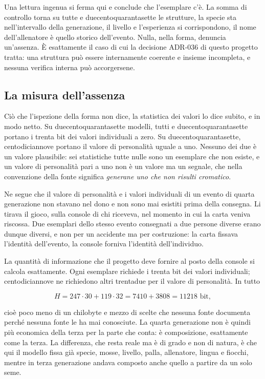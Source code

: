 Una lettura ingenua si ferma qui e conclude che l'esemplare c'è. La somma di controllo torna su tutte e duecentoquarantasette le strutture, la specie sta nell'intervallo della generazione, il livello e l'esperienza si corrispondono, il nome dell'allenatore è quello storico dell'evento. Nulla, nella forma, denuncia un'assenza. È esattamente il caso di cui la decisione ADR-036 di questo progetto tratta: una struttura può essere internamente coerente e insieme incompleta, e nessuna verifica interna può accorgersene.

\subsection{La misura dell'assenza}

Ciò che l'ispezione della forma non dice, la statistica dei valori lo dice subito, e in modo netto. Su duecentoquarantasette modelli, tutti e duecentoquarantasette portano i trenta bit dei valori individuali a zero. Su duecentoquarantasette, centodiciannove portano il valore di personalità uguale a uno. Nessuno dei due è un valore plausibile: sei statistiche tutte nulle sono un esemplare che non esiste, e un valore di personalità pari a uno non è un valore ma un segnale, che nella convenzione della fonte significa \emph{generane uno che non risulti cromatico}.

Ne segue che il valore di personalità e i valori individuali di un evento di quarta generazione non stavano nel dono e non sono mai esistiti prima della consegna. Li tirava il gioco, sulla console di chi riceveva, nel momento in cui la carta veniva riscossa. Due esemplari dello stesso evento consegnati a due persone diverse erano dunque diversi, e non per un accidente ma per costruzione: la carta fissava l'identità dell'evento, la console forniva l'identità dell'individuo.

La quantità di informazione che il progetto deve fornire al posto della console si calcola esattamente. Ogni esemplare richiede i trenta bit dei valori individuali; centodiciannove ne richiedono altri trentadue per il valore di personalità. In tutto

\[
H = 247 \cdot 30 + 119 \cdot 32 = 7410 + 3808 = 11218 \text{ bit},
\]

cioè poco meno di un chilobyte e mezzo di scelte che nessuna fonte documenta perché nessuna fonte le ha mai conosciute. La quarta generazione non è quindi più economica della terza per la parte che conta: è composizione, esattamente come la terza. La differenza, che resta reale ma è di grado e non di natura, è che qui il modello fissa già specie, mosse, livello, palla, allenatore, lingua e fiocchi, mentre in terza generazione andava composto anche quello a partire da un solo seme.

